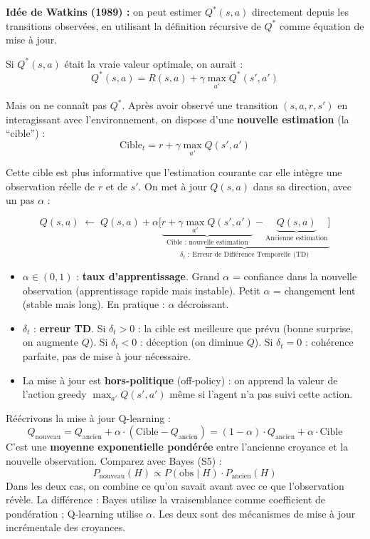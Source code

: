 \documentclass[11pt,a4paper]{article}
\begin{document}
\textbf{Idée de Watkins (1989) :} on peut estimer $Q^*(s,a)$ directement depuis les transitions observées, en utilisant la définition récursive de $Q^*$ comme équation de mise à jour.

Si $Q^*(s,a)$ était la vraie valeur optimale, on aurait :
$$Q^*(s, a) = R(s, a) + \gamma \max_{a'} Q^*(s', a')$$

Mais on ne connaît pas $Q^*$. Après avoir observé une transition $(s, a, r, s')$ en interagissant avec l'environnement, on dispose d'une \textbf{nouvelle estimation} (la ``cible'') :
$$\text{Cible}_t = r + \gamma \max_{a'} Q(s', a')$$

Cette cible est plus informative que l'estimation courante car elle intègre une observation réelle de $r$ et de $s'$. On met à jour $Q(s,a)$ dans sa direction, avec un pas $\alpha$ :

\begin{theorembox}
$$\boxed{Q(s, a) \;\leftarrow\; Q(s, a) + \alpha \underbrace{\bigl[ \underbrace{r + \gamma \max_{a'} Q(s', a')}_{\text{Cible : nouvelle estimation}} - \underbrace{Q(s, a)}_{\text{Ancienne estimation}} \bigr]}_{\delta_t \;:\; \text{Erreur de Différence Temporelle (TD)}}}$$

\begin{itemize}
    \item $\alpha \in (0,1)$ : \textbf{taux d'apprentissage}. Grand $\alpha$ = confiance dans la nouvelle observation (apprentissage rapide mais instable). Petit $\alpha$ = changement lent (stable mais long). En pratique : $\alpha$ décroissant.
    \item $\delta_t$ : \textbf{erreur TD}. Si $\delta_t > 0$ : la cible est meilleure que prévu (bonne surprise, on augmente $Q$). Si $\delta_t < 0$ : déception (on diminue $Q$). Si $\delta_t = 0$ : cohérence parfaite, pas de mise à jour nécessaire.
    \item La mise à jour est \textbf{hors-politique} (off-policy) : on apprend la valeur de l'action greedy $\max_{a'}Q(s',a')$ même si l'agent n'a pas suivi cette action.
\end{itemize}
\end{theorembox}

\begin{exemplebox}
Réécrivons la mise à jour Q-learning :
$$Q_{\text{nouveau}} = Q_{\text{ancien}} + \alpha \cdot (\text{Cible} - Q_{\text{ancien}}) = (1-\alpha) \cdot Q_{\text{ancien}} + \alpha \cdot \text{Cible}$$
C'est une \textbf{moyenne exponentielle pondérée} entre l'ancienne croyance et la nouvelle observation. Comparez avec Bayes (S5) :
$$P_{\text{nouveau}}(H) \propto P(\text{obs} \mid H) \cdot P_{\text{ancien}}(H)$$
Dans les deux cas, on combine ce qu'on savait avant avec ce que l'observation révèle. La différence : Bayes utilise la vraisemblance comme coefficient de pondération ; Q-learning utilise $\alpha$. Les deux sont des mécanismes de mise à jour incrémentale des croyances.
\end{exemplebox}
\end{document}
